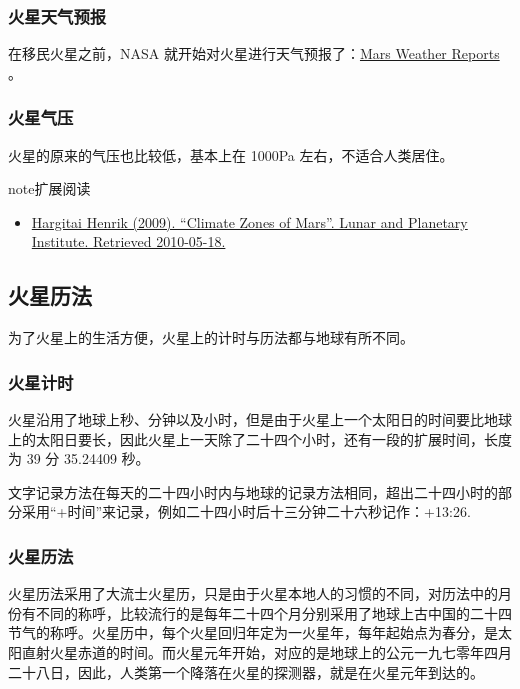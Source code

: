 \documentclass[letterpaper,10pt]{sphinxmanual}
\begin{document}
\subsubsection{火星天气预报}
\label{mars:id15}
在移民火星之前，NASA 就开始对火星进行天气预报了：\href{http://www.msss.com/msss\_images/subject/weather\_reports.html}{Mars Weather Reports} 。


\subsubsection{火星气压}
\label{mars:id16}
火星的原来的气压也比较低，基本上在 1000Pa 左右，不适合人类居住。
\begin{figure}[htbp]
\centering
\end{figure}

\begin{notice}{note}{扩展阅读}
\begin{itemize}
\item {} 
\href{http://www.lpi.usra.edu/meetings/lpsc2010/pdf/1199.pdf}{Hargitai Henrik (2009). ``Climate Zones of Mars''. Lunar and Planetary Institute. Retrieved 2010-05-18.}

\end{itemize}
\end{notice}


\subsection{火星历法}
\label{mars:id18}
为了火星上的生活方便，火星上的计时与历法都与地球有所不同。


\subsubsection{火星计时}
\label{mars:id19}\label{mars:index-0}
火星沿用了地球上秒、分钟以及小时，但是由于火星上一个太阳日的时间要比地球上的太阳日要长，因此火星上一天除了二十四个小时，还有一段的扩展时间，长度为 39 分 35.24409 秒。

文字记录方法在每天的二十四小时内与地球的记录方法相同，超出二十四小时的部分采用“+时间”来记录，例如二十四小时后十三分钟二十六秒记作：+13:26.


\subsubsection{火星历法}
\label{mars:id20}\label{mars:index-1}
火星历法采用了大流士火星历，只是由于火星本地人的习惯的不同，对历法中的月份有不同的称呼，比较流行的是每年二十四个月分别采用了地球上古中国的二十四节气的称呼。火星历中，每个火星回归年定为一火星年，每年起始点为春分，是太阳直射火星赤道的时间。而火星元年开始，对应的是地球上的公元一九七零年四月二十八日，因此，人类第一个降落在火星的探测器，就是在火星元年到达的。
\end{document}
